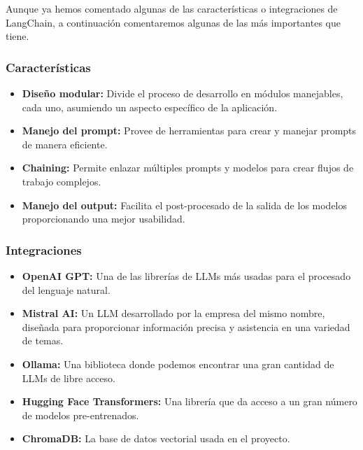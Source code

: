             Aunque ya hemos comentado algunas de las características o integraciones de LangChain, a continuación comentaremos algunas de las más importantes que tiene.

            \subsubsection{Características}

                \begin{itemize}
                    \item \textbf{Diseño modular:} Divide el proceso de desarrollo en módulos manejables, cada uno, asumiendo un aspecto específico de la aplicación.
                    \item \textbf{Manejo del prompt:} Provee de herramientas para crear y manejar prompts de manera eficiente.
                    \item \textbf{Chaining:} Permite enlazar múltiples prompts y modelos para crear flujos de trabajo complejos.
                    \item \textbf{Manejo del output:} Facilita el post-procesado de la salida de los modelos proporcionando una mejor usabilidad.
                \end{itemize}

            \subsubsection{Integraciones}    

                \begin{itemize}
                    \item \textbf{OpenAI GPT:} Una de las librerías de LLMs más usadas para el procesado del lenguaje natural.
                    \item \textbf{Mistral AI:} Un LLM desarrollado por la empresa del mismo nombre, diseñada para proporcionar información precisa y asistencia en una variedad de temas.
                    \item \textbf{Ollama:} Una biblioteca donde podemos encontrar una gran cantidad de LLMs de libre acceso.
                    \item \textbf{Hugging Face Transformers:} Una librería que da acceso a un gran número de modelos pre-entrenados.
                    \item \textbf{ChromaDB:} La base de datos vectorial usada en el proyecto.
                \end{itemize}

